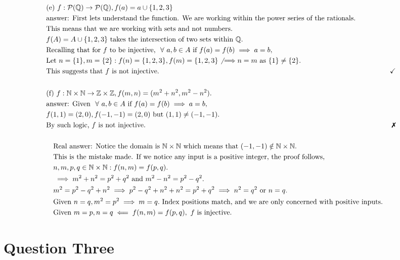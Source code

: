 \documentclass{article}
\begin{document}
\begin{align*}
            &\text{(e) }f:\power(\Q) \rightarrow \power(\Q), f(a) = a\cup\{1,2,3\}\\
            &\text{answer: First lets understand the function. We are working within the power series of the rationals.}\\
            &\text{This means that we are working with sets and not numbers. }\\
            &f(A) = A\cup\{1,2,3\}\text{ takes the intersection of two sets within }\Q.\\
            &\text{Recalling that for }f\text{ to be injective, }\all a,b\in A \text{ if }f(a) = f(b) \implies a = b,\\
            &\text{Let }n = \{1\}, m = \{2\}: f(n) = \{1,2,3\}, f(m) = \{1,2,3\} \not{\implies} n = m\text{ as } \{1\} \neq \{2\}.\\
            &\text{This suggests that }f \text{ is not injective.} &\checkmark\\
            &\\
            &\text{(f) }f:\N\times\N\rightarrow\Z\times\Z, f(m,n) = (m^2 + n^2, m^2 - n^2).\\
            &\text{answer: Given }\all a,b\in A \text{ if }f(a) = f(b) \implies a = b,\\
            &f(1,1) = (2, 0), f(-1, -1) = (2, 0) \text{ but } (1,1)\neq (-1,-1).\\
            &\text{By such logic, }f \text{ is not injective.}&\xmark\\
            &\\
            &\quad\text{Real answer: Notice the domain is }\N\times\N\text{ which means that }(-1,-1)\notin \N\times\N.\\
            &\quad\text{This is the mistake made. If we notice any input is a positive integer, the proof follows, }\\
            &\quad n,m, p, q \in \N\times\N : f(n,m) = f(p,q).\\
            &\quad \implies m^2 + n^2 = p^2 + q^2 \text{ and }m^2 - n^2 = p^2 - q^2.\\
            &\quad m^2 = p^2 - q^2 + n^2 \implies p^2 - q^2 + n^2 + n^2 = p^2 + q^2 \implies n^2 = q^2 \text{ or } n = q.\\
            &\quad \text{Given }n = q, m^2 = p^2 \implies m = q.\text{ Index positions match, and we are only concerned with positive inputs.}\\
            &\quad\text{Given }m = p, n = q \impliedby f(n,m) = f(p,q),~ f\text{ is injective.}\\
        \end{align*}

    \section{Question Three}
        \begin{align*}
            &\\
        \end{align*}
\end{document}
